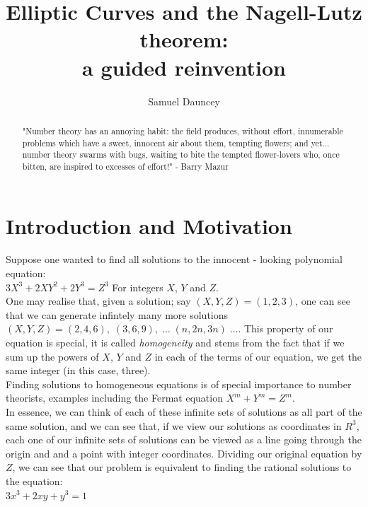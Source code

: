 \documentclass{article}
\title{Elliptic Curves and the Nagell-Lutz theorem:\\a guided reinvention}
\author{Samuel Dauncey}
\begin{document}
\maketitle

\begin{abstract}
    
"Number theory has an annoying habit: the field produces, without effort, innumerable problems which have a sweet, innocent air about them, tempting flowers; and yet... number theory swarms with bugs, waiting to bite the tempted flower-lovers who, once bitten, are inspired to excesses of effort!" - Barry Mazur
\end{abstract}

\section{Introduction and Motivation}

Suppose one wanted to find all solutions to the innocent - looking polynomial equation:\\

$3 X^3 +  2 X Y^2 + 2 Y^3 = Z^3$ \quad For integers $X$, $Y$ and $Z$. \\

 One may realise that, given a solution; say $(X, Y, Z) = (1, 2, 3)$, one can see that we can generate infintely many more solutions $(X, Y, Z) = (2, 4, 6), \; (3, 6, 9), \; \dots \; (n, 2n, 3n) \; \dots $. This property of our equation is special, it is called \emph{homogeneity} and stems from the fact that if we sum up the powers of $X$, $Y$ and $Z$ in each of the terms of our equation, we get the same integer (in this case, three). \\
 
 Finding solutions to homogeneous equations is of special importance to number theorists, examples including the Fermat equation $X^m + Y^m = Z^m$. \\
 
 In essence, we can think of each of these infinite sets of solutions as all part of the same solution, and we can see that, if we view our solutions as coordinates in $R^3$, each one of our infinite sets of solutions can be viewed as a line going through the origin and and a point with integer coordinates. Dividing our original equation by $Z$, we can see that our problem is equivalent to finding the rational solutions to the equation:\\
 
 $3x^3 + 2xy + y^3 = 1$\\
 
\end{document}

